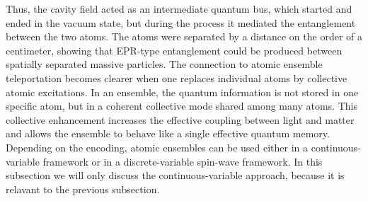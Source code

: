 \documentclass[aps,prd,preprint,floats,epsf,superscriptaddress,nofootinbib]{revtex4}
\begin{document}
Thus, the cavity field acted as an intermediate quantum bus, which started and ended in the vacuum state, but during the process it mediated the entanglement between the two atoms. The atoms were separated by a distance on the order of a centimeter, showing that EPR-type entanglement could be produced between spatially separated massive particles.
The connection to atomic ensemble teleportation becomes clearer when one replaces individual atoms by collective atomic excitations. In an ensemble, the quantum information is not stored in one specific atom, but in a coherent collective mode shared among many atoms.
This collective enhancement increases the effective coupling between light and matter and allows the ensemble to behave like a single effective quantum memory. Depending on the encoding, atomic ensembles can be used either in a continuous-variable framework or in a discrete-variable spin-wave framework. In this subsection we will only discuss the continuous-variable approach, because it is relavant to the previous subsection. 
\end{document}
